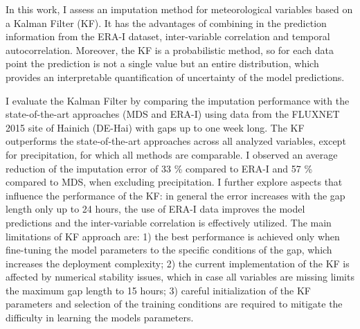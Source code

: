 \documentclass{article}
\begin{document}
In this work, I assess an imputation method for meteorological variables based on a Kalman Filter (KF). It has the advantages of combining in the prediction information from the ERA-I dataset, inter-variable correlation and  temporal autocorrelation. Moreover, the KF is a probabilistic method, so for each data point the prediction is not a single value but an entire distribution, which provides an interpretable quantification of uncertainty of the model predictions.

I evaluate the Kalman Filter by  comparing the imputation performance with the state-of-the-art approaches (MDS and ERA-I) using data from the FLUXNET 2015 site of Hainich (DE-Hai) with gaps up to one week long. The KF outperforms the state-of-the-art approaches across all analyzed variables, except for precipitation, for which all methods are comparable. I observed an average reduction of the imputation error of 33 \% compared to ERA-I and  57 \% compared to MDS, when excluding precipitation. I further explore aspects that influence the performance of the KF: in general the error increases with the gap length only up to 24 hours, the use of ERA-I data improves the model predictions and the inter-variable correlation is effectively utilized.
The main limitations of KF approach are: 1) the best performance is achieved only when fine-tuning the model parameters to the specific conditions of the gap, which increases the deployment complexity; 2) the current implementation of the KF is affected by numerical stability issues, which in case all variables are missing limits the maximum gap length to 15 hours; 3) careful initialization of the KF parameters and selection of the training conditions are required to mitigate the difficulty in learning the models parameters. 
\thispagestyle{empty}
\clearpage
\end{document}
